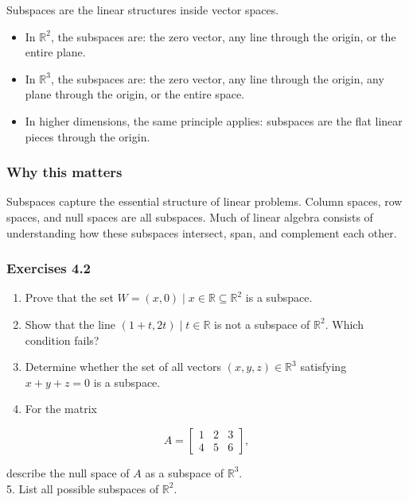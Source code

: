 \documentclass[
  12pt,
  a4paper,
]{article}
\begin{document}
Subspaces are the linear structures inside vector spaces.

\begin{itemize}
\item
  In \(\mathbb{R}^2\), the subspaces are: the zero vector, any line
  through the origin, or the entire plane.
\item
  In \(\mathbb{R}^3\), the subspaces are: the zero vector, any line
  through the origin, any plane through the origin, or the entire space.
\item
  In higher dimensions, the same principle applies: subspaces are the
  flat linear pieces through the origin.
\end{itemize}

\subsubsection{Why this matters}\label{why-this-matters-13}

Subspaces capture the essential structure of linear problems. Column
spaces, row spaces, and null spaces are all subspaces. Much of linear
algebra consists of understanding how these subspaces intersect, span,
and complement each other.

\subsubsection{Exercises 4.2}\label{exercises-42}

\begin{enumerate}
\def\labelenumi{\arabic{enumi}.}
\item
  Prove that the set
  \(W = { (x,0) \mid x \in \mathbb{R} } \subseteq \mathbb{R}^2\) is a
  subspace.
\item
  Show that the line \({ (1+t, 2t) \mid t \in \mathbb{R} }\) is not a
  subspace of \(\mathbb{R}^2\). Which condition fails?
\item
  Determine whether the set of all vectors \((x,y,z) \in \mathbb{R}^3\)
  satisfying \(x+y+z=0\) is a subspace.
\item
  For the matrix
\end{enumerate}

\[A = \begin{bmatrix} 1 & 2 & 3 \\ 4 & 5 & 6 \end{bmatrix},\]

describe the null space of \(A\) as a subspace of \(\mathbb{R}^3\).\\
5. List all possible subspaces of \(\mathbb{R}^2\).
\end{document}
